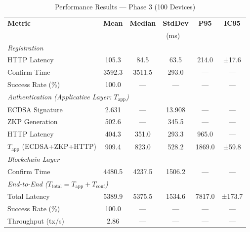 %
%
\begin{table}[htbp]
\centering
\caption{Performance Results --- Phase 3 (100 Devices)}
\label{tab:phase3}
\begin{tabular}{lccccc}
\toprule
\textbf{Metric} & \textbf{Mean} & \textbf{Median} & \textbf{StdDev} & \textbf{P95} & \textbf{IC95} \\
                & \multicolumn{5}{c}{(ms)} \\
\midrule
\multicolumn{6}{l}{\textit{Registration}} \\
HTTP Latency      & 105.3 & 84.5 & 63.5 & 214.0 & ±17.6 \\
Confirm Time      & 3592.3 & 3511.5 & 293.0 & ---  & ---   \\
Success Rate (\%) & 100.0 & ---  & ---  & ---  & ---   \\
\midrule
\multicolumn{6}{l}{\textit{Authentication (Applicative Layer: $T_{\mathrm{app}}$)}} \\
ECDSA Signature   & 2.631 & ---  & 13.908 & ---  & ---   \\
ZKP Generation    & 502.6 & ---  & 345.5 & ---  & ---   \\
HTTP Latency      & 404.3 & 351.0 & 293.3 & 965.0 & ---   \\
$T_{\mathrm{app}}$ (ECDSA+ZKP+HTTP) & 909.4 & 823.0 & 528.2 & 1869.0 & ±59.8 \\
\midrule
\multicolumn{6}{l}{\textit{Blockchain Layer}} \\
Confirm Time      & 4480.5 & 4237.5 & 1506.2 & ---  & ---   \\
\midrule
\multicolumn{6}{l}{\textit{End-to-End ($T_{\mathrm{total}} = T_{\mathrm{app}} + T_{\mathrm{conf}}$)}} \\
Total Latency     & 5389.9 & 5375.5 & 1534.6 & 7817.0 & ±173.7 \\
Success Rate (\%) & 100.0 & ---  & ---  & ---  & ---   \\
Throughput (tx/s) & 2.86 & ---  & ---  & ---  & ---   \\
\bottomrule
\end{tabular}
\end{table}
